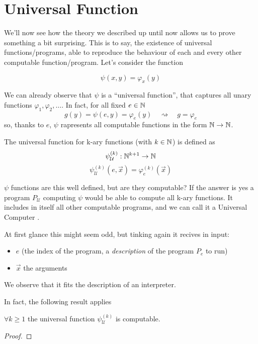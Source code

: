 \chapter {Universal Function}
We'll now see how the theory we described up until now allows us to
prove something a bit surprising. This is to say, the existence of
universal functions/programs, able to reproduce the behaviour of each
and every other computable function/program. Let's consider the function

\[
  \psi(x,y) = \varphi_x(y)
\]

We can already observe that $\psi$ is a ``universal function'', that
captures all unary functions $\varphi_1, \varphi_2, \dots$. In fact,
for all fixed $e \in \mathbb{N}$
\[
  g(y) = \psi(e,y) = \varphi_e(y) \quad \rightsquigarrow \quad g = \varphi_e
\]
so, thanks to $e$, $\psi$ rapresents all computable functions in the
form $\mathbb{N} \rightarrow \mathbb{N}$.

\begin{definition}
  The universal function for k-ary functions (with $k \in \mathbb{N}$) is
  defined as
  \[
    \psi_{\mathcal{U}}^{(k)} : \mathbb{N}^{k+1} \rightarrow \mathbb{N}
  \]
  \[
    \psi_{\mathcal{U}}^{(k)} (e, \vec{x}) = \varphi_e^{(k)}(\vec{x})
  \]
\end{definition}
$\psi$ functions are this well defined, but are they computable? If
the answer is yes a program $P_{\mathcal{U}}$ computing $\psi$ would
be able to compute all k-ary functions. It includes in itself all
other computable programs, and we can call it a Universal Computer
\cite{davis:2011}.

At first glance this might seem odd, but tinking again it recives in
input:
\begin{itemize}
\item $e$ (the index of the program, a \textit{description} of the
  program $P_e$ to run)
\item $\vec{x}$ the arguments
\end{itemize}
We observe that it fits the description of an interpreter.

In fact, the following result applies

\begin{theorem}
  $\forall k \geq 1$ the universal function $\psi_{\mathcal{U}}^{(k)}$
  is computable.

  \begin{proof}
    
  \end{proof}
\end{theorem}

